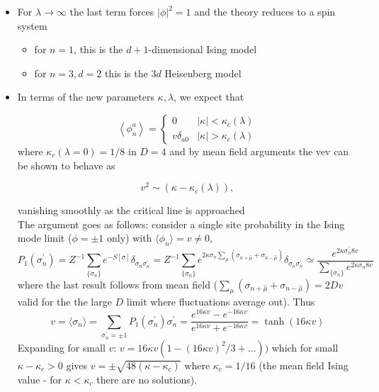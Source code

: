\begin{itemize}
  \item For \(\lambda \rightarrow \infty\) the last term forces \(|\phi|^{2}=1\) and the theory reduces to a spin system 
  \begin{itemize}
      \item for $n=1$, this is the $d+1$-dimensional Ising model
      \item for $n=3, d=2$ this is the $3d$ Heisenberg model
  \end{itemize}
\item In terms of the new parameters \(\kappa, \lambda\), we expect that


\begin{equation}
\left\langle\phi_{n}^{a}\right\rangle=\left\{\begin{array}{cl}
0 & |\kappa| < \kappa_{c}(\lambda) \\
v \delta_{a 0} & |\kappa| > \kappa_{c}(\lambda)
\end{array}\right.
\end{equation}
where $\kappa_{c}(\lambda=0)=1 / 8$ in $ D=4$
and by mean field arguments the vev can be shown to behave as

\begin{equation}
v^{2} \sim\left(\kappa-\kappa_{c}(\lambda)\right),
\end{equation}

vanishing smoothly as the critical line is approached\\

The argument goes as follows: consider a single site probability in the Ising mode limit ($\phi=\pm1$ only) with $\langle \phi_n\rangle=v\ne0$,
\begin{equation}
    P_1(\sigma^\prime_n)=Z^{-1}\sum_{\{\sigma_n\}}e^{-S[\sigma]}\delta_{\sigma_n\sigma_n^\prime}
    =Z^{-1}\sum_{\{\sigma_n\}}e^{2\kappa \sigma_n\sum_\mu(\sigma_{n+\hat\mu}+\sigma_{n-\hat\mu})}\delta_{\sigma_n\sigma_n^\prime}
    \simeq \frac{e^{2\kappa \sigma_n^\prime 8 v}}{\sum_{\{\sigma_n\}}e^{2\kappa\sigma_n 8v}}
\end{equation}
where the last result follows from mean field ($\sum_\mu(\sigma_{n+\hat\mu}+\sigma_{n-\hat\mu})=2Dv$ valid for the the large $D$ limit where fluctuations average out). Thus 
\begin{equation}
    v=\langle \sigma_n\rangle=\sum_{\sigma_n^\prime=\pm1}P_1(\sigma_n^\prime)\sigma_n^\prime = 
    \frac{e^{16\kappa v}-e^{-16\kappa v}}{e^{16\kappa v}+e^{-16\kappa v}}= \tanh(16\kappa v)
\end{equation}
Expanding for small $v$: $v=16\kappa v (1-(16\kappa v)^2/3+\ldots))$ which for small $\kappa -\kappa_c>0$ gives $v=\pm\sqrt{48(\kappa-\kappa_c)}$ where $\kappa_c=1/16$ (the mean field Ising value - for $\kappa<\kappa_c$ there are no solutions).


\end{itemize}
